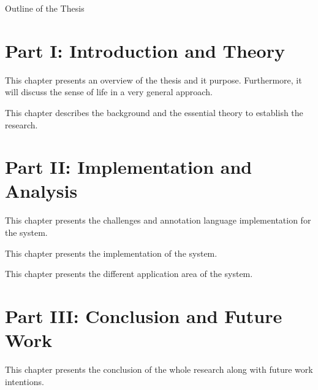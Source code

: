 \clearemptydoublepage

{}

\begin{center}
	\huge{Outline of the Thesis}
\end{center}




\section*{Part I: Introduction and Theory}

  \vspace{1mm}

\noindent  This chapter presents an overview of the thesis and it purpose. Furthermore, it will discuss the sense of life in a very general approach.  \\

  \vspace{1mm}

\noindent  This chapter describes the background and the essential theory to establish the research.   \\

\section*{Part II: Implementation and Analysis}

  \vspace{1mm}

\noindent  This chapter presents the challenges and annotation language implementation for the system.

  \vspace{1mm}

\noindent  This chapter presents the implementation of the system.

  \vspace{1mm}

\noindent  This chapter presents the different application area of the system.

\section*{Part III: Conclusion and Future Work}

  \vspace{1mm}

\noindent  This chapter presents the conclusion of the whole research along with future work intentions.